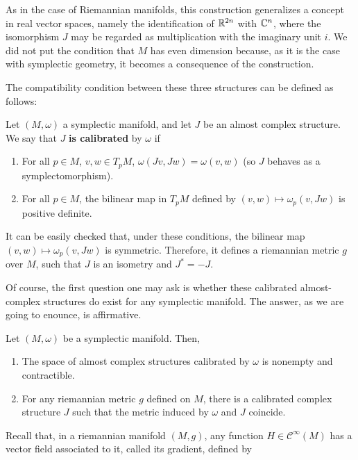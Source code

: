 As in the case of Riemannian manifolds, this construction generalizes a concept in real vector spaces, namely the identification of $\mathbb{R}^{2n}$ with $\mathbb{C}^n$, where the isomorphism $J$ may be regarded as multiplication with the imaginary unit $i$. We did not put the condition that $M$ has even dimension because, as it is the case with symplectic geometry, it becomes a consequence of the construction.

The compatibility condition between these three structures can be defined as follows:

\begin{deff} \label{definition:calibrated_almost_complex}
Let $(M,\omega)$ a symplectic manifold, and let $J$ be an almost complex structure. We say that $J$ {\bf is calibrated} by $\omega$ if

\begin{enumerate}
	\item For all $p \in M$, $v,w \in T_pM$, $\omega(Jv,Jw) = \omega(v,w)$ (so $J$ behaves as a symplectomorphism).
	\item For all $p \in M$, the bilinear map in $T_pM$ defined by $(v,w) \mapsto \omega_p(v,Jw)$ is positive definite.
\end{enumerate}
\end{deff}

It can be easily checked that, under these conditions, the bilinear map $(v,w) \mapsto \omega_p(v,Jw)$ is symmetric. Therefore, it defines a riemannian metric $g$ over $M$, such that $J$ is an isometry and $J^{\ast} = - J$.

Of course, the first question one may ask is whether these calibrated almost-complex structures do exist for any symplectic manifold. The answer, as we are going to enounce, is affirmative.

\begin{prop} Let $(M,\omega)$ be a symplectic manifold. Then,

\begin{enumerate}
	\item The space of almost complex structures calibrated by $\omega$ is nonempty and contractible.
	\item For any riemannian metric $g$ defined on $M$, there is a calibrated complex structure $J$ such that the metric induced by $\omega$ and $J$ coincide.
\end{enumerate}
\end{prop}

Recall that, in a riemannian manifold $(M,g)$, any function $H \in \mathcal{C}^{\infty}(M)$ has a vector field associated to it, called its gradient, defined by

